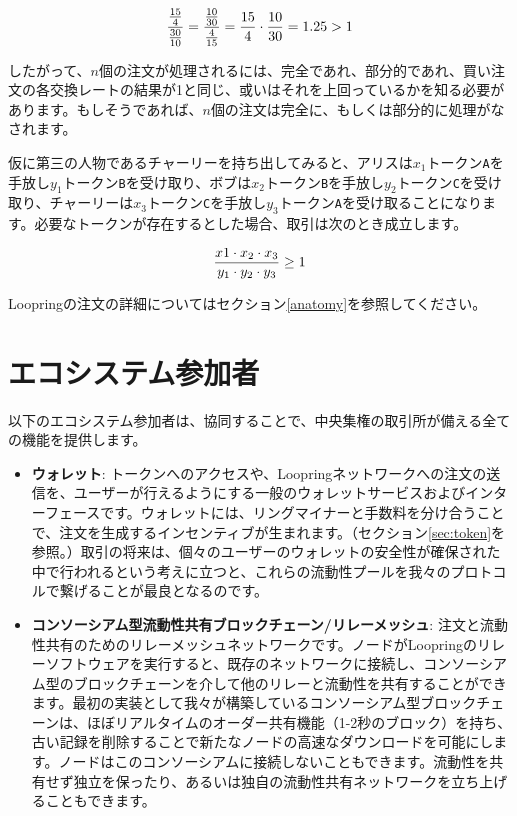 \documentclass{article}
\begin{document}
\begin{multicols}{2}
\begin{equation}
{{15\over 4} \over {30\over 10}} = {{10\over 30} \over {4\over 15}}={15 \over 4} \cdot {10 \over 30} = 1.25 > 1
\end{equation}

したがって、$n$個の注文が処理されるには、完全であれ、部分的であれ、買い注文の各交換レートの結果が1と同じ、或いはそれを上回っているかを知る必要があります。もしそうであれば、$n$個の注文は完全に、もしくは部分的に処理がなされます。\cite{supersymmetry}

仮に第三の人物であるチャーリーを持ち出してみると、アリスは$x_1$トークン\verb|A|を手放し$y_1$トークン\verb|B|を受け取り、ボブは$x_2$トークン\verb|B|を手放し$y_2$トークン\verb|C|を受け取り、チャーリーは$x_3$トークン\verb|C|を手放し$y_3$トークン\verb|A|を受け取ることになります。必要なトークンが存在するとした場合、取引は次のとき成立します。

\begin{equation}
{{x1 \cdot x_2 \cdot x_3 \over y_1 \cdot y_2 \cdot y_3} \geq 1}
\end{equation}


Loopringの注文の詳細についてはセクション\ref{anatomy}を参照してください。



\section{エコシステム参加者\label{sec:ecosystem}}
以下のエコシステム参加者は、協同することで、中央集権の取引所が備える全ての機能を提供します。

\begin{itemize}

\item \textbf{ウォレット}: トークンへのアクセスや、Loopringネットワークへの注文の送信を、ユーザーが行えるようにする一般のウォレットサービスおよびインターフェースです。ウォレットには、リングマイナーと手数料を分け合うことで、注文を生成するインセンティブが生まれます。（セクション\ref{sec:token}を参照。）取引の将来は、個々のユーザーのウォレットの安全性が確保された中で行われるという考えに立つと、これらの流動性プールを我々のプロトコルで繋げることが最良となるのです。

\item \textbf{コンソーシアム型流動性共有ブロックチェーン/リレーメッシュ}: 注文と流動性共有のためのリレーメッシュネットワークです。ノードがLoopringのリレーソフトウェアを実行すると、既存のネットワークに接続し、コンソーシアム型のブロックチェーンを介して他のリレーと流動性を共有することができます。最初の実装として我々が構築しているコンソーシアム型ブロックチェーンは、ほぼリアルタイムのオーダー共有機能（1-2秒のブロック）を持ち、古い記録を削除することで新たなノードの高速なダウンロードを可能にします。ノードはこのコンソーシアムに接続しないこともできます。流動性を共有せず独立を保ったり、あるいは独自の流動性共有ネットワークを立ち上げることもできます。


\end{itemize}
\end{multicols}
\end{document}
